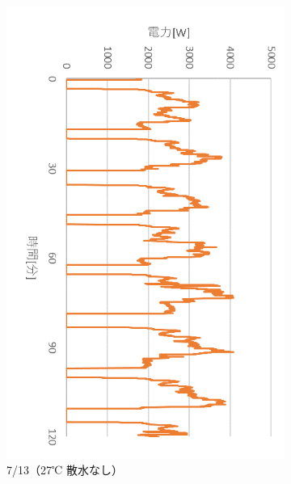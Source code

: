 \documentclass[a4j,fleqn,dvipdfmx,uplatex]{jsarticle}
\begin{document}
\begin{figure}[htb]
  \centering
  \begin{subfigure}[b]{0.42\linewidth}
    \centering
    \includegraphics[width=\linewidth]{img/0713_power.png}
    \caption{7/13（27℃ 散水なし）}
  \end{subfigure}
  \begin{subfigure}[b]{0.42\linewidth}
    \centering

\end{subfigure}
\end{figure}
\end{document}
